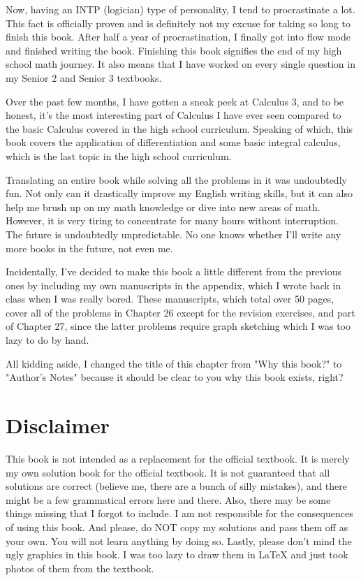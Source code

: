 \documentclass{report}
\begin{document}
Now, having an INTP (logician) type of personality, I tend to procrastinate a
lot. This fact is officially proven and is definitely not my excuse for taking
so long to finish this book. After half a year of procrastination, I finally
got into flow mode and finished writing the book. Finishing this book signifies
the end of my high school math journey. It also means that I have worked on
every single question in my Senior 2 and Senior 3 textbooks.

Over the past few months, I have gotten a sneak peek at Calculus 3, and to be
honest, it's the most interesting part of Calculus I have ever seen compared to
the basic Calculus covered in the high school curriculum. Speaking of which,
this book covers the application of differentiation and some basic integral
calculus, which is the last topic in the high school curriculum.

Translating an entire book while solving all the problems in it was undoubtedly
fun. Not only can it drastically improve my English writing skills, but it can
also help me brush up on my math knowledge or dive into new areas of math.
However, it is very tiring to concentrate for many hours without interruption.
The future is undoubtedly unpredictable. No one knows whether I'll write any
more books in the future, not even me.

Incidentally, I've decided to make this book a little different from the
previous ones by including my own manuscripts in the appendix, which I wrote
back in class when I was really bored. These manuscripts, which total over 50
pages, cover all of the problems in Chapter 26 except for the revision
exercises, and part of Chapter 27, since the latter problems require graph
sketching which I was too lazy to do by hand.

All kidding aside, I changed the title of this chapter from "Why this book?" to
"Author's Notes" because it should be clear to you why this book exists, right?

\section*{Disclaimer}

This book is not intended as a replacement for the official textbook. It is
merely my own solution book for the official textbook. It is not guaranteed
that all solutions are correct (believe me, there are a bunch of silly
mistakes), and there might be a few grammatical errors here and there. Also,
there may be some things missing that I forgot to include. I am not responsible
for the consequences of using this book. And please, do NOT copy my solutions
and pass them off as your own. You will not learn anything by doing so. Lastly,
please don't mind the ugly graphics in this book. I was too lazy to draw them
in LaTeX and just took photos of them from the textbook.
\end{document}
